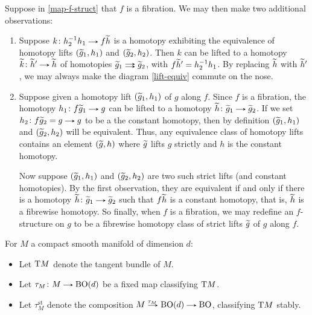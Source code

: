 \begin{remarks}
  Suppose in \eqref{map-f-struct} that $f$ is a fibration. We may then
  make two additional observations:
  \begin{enumerate}
  \item
    \label{strict-homotopy}
    Suppose $k \c h_2^{-1}h_1 \to f\til h$ is a homotopy
    exhibiting the equivalence of homotopy lifts $(\widetilde g_1, h_1)$ and
    $(\widetilde g_2, h_2)$. Then $k$ can be lifted to a homotopy $\til k \c
    \til h' \to \til h$ of homotopies $\til g_1 \doubto \til g_2$,
    with $f\widetilde h' = h_2^{-1}h_1$. By replacing $\widetilde h$ with $\widetilde
    h'$, we may always make the diagram \eqref{lift-equiv} commute on
    the nose.
  \item
    \label{strict-lift}
    Suppose given a homotopy lift $(\widetilde g_1, h_1)$ of $g$ along
    $f$. Since $f$ is a fibration, the homotopy $h_1 \c f\til g_1 \to
    g$ can be lifted to a homotopy $\til h \c \til g_1 \to \til
    g_2$. If we set $h_2 \c f\til g_2 = g \to g$ to be a the constant
    homotopy, then by definition $(\widetilde g_1, h_1)$ and $(\widetilde g_2,
    h_2)$ will be equivalent. Thus, any equivalence class of homotopy
    lifts contains an element $(\widetilde g, h)$ where $\widetilde g$ lifts $g$
    strictly and $h$ is the constant homotopy.

    Now suppose $(\widetilde g_1, h_1)$ and $(\widetilde g_2, h_2)$ are two such
    strict lifts (and constant homotopies). By the first observation,
    they are equivalent if and only if there is a homotopy $\til h \c
    \til g_1 \to \til g_2$ such that $f\widetilde h$ is a constant homotopy,
    that is, $\widetilde h$ is a fibrewise homotopy. So finally, when $f$ is
    a fibration, we may redefine an $f$-structure on $g$ to be a
    fibrewise homotopy class of strict lifts $\widetilde g$ of $g$ along
    $f$.
  \end{enumerate}
\end{remarks}

\newcommand{\st}{\mathrm{st}}
\begin{notation}
  For $M$ a compact smooth manifold of dimension $d$:
  \begin{itemize}
  \item Let $\mathrm{T} M$ denote the tangent bundle of $M$.
  \item Let $\tau_M \c M \to \B\O(d)$ be a fixed map classifying $\mathrm{T}
    M$.
  \item Let $\tau_M^\st$ denote the composition $M \lblto{\tau_M}
    \B\O(d) \to \B\O$, classifying $\mathrm{T} M$ stably.
  \end{itemize}

\end{notation}

